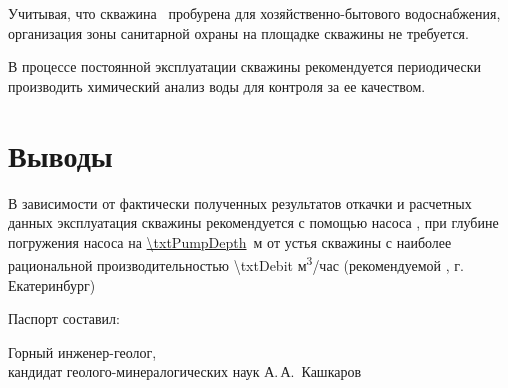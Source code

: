 Учитывая, что скважина \txtNumber \, пробурена для хозяйственно-бытового водоснабжения, организация зоны санитарной охраны на площадке скважины не требуется.

В процессе постоянной эксплуатации скважины рекомендуется периодически производить химический анализ воды для контроля за ее качеством.

\section{Выводы}

В зависимости от фактически полученных результатов откачки и расчетных данных эксплуатация скважины рекомендуется с помощью насоса  \txtPump, при глубине погружения насоса  на \underline{\num{\txtPumpDepth}} \,м от устья скважины с наиболее рациональной производительностью 	{\num{\txtDebit}} м\textsuperscript{3}/час (рекомендуемой \txtExecutor, г. Екатеринбург)

\bigskip

Паспорт составил:

\bigskip

\begin{minipage}{1.0\textwidth}
	Горный инженер-геолог,\\
	кандидат геолого-минералогических наук 
	А.\,А.~Кашкаров
\end{minipage}



